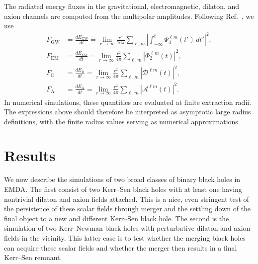 The radiated energy fluxes in the gravitational, electromagnetic, dilaton, and axion channels are computed from the multipolar amplitudes. Following Ref.~\cite{Zilhao2012}, we use
\begin{align}
    F_{\mathrm{GW}}
    &=
    \frac{dE_{\mathrm{GW}}}{dt}
    =
    \lim_{r\to\infty}
    \frac{r^2}{16\pi}
    \sum_{\ell,m}
    \left|
        \int_{-\infty}^{t}
        \Psi_4^{\ell m}(t')\,dt'
    \right|^2,
    \label{eq:app waveex gw flux}
    \\
    F_{\mathrm{EM}}
    &=
    \frac{dE_{\mathrm{EM}}}{dt}
    =
    \lim_{r\to\infty}
    \frac{r^2}{4\pi}
    \sum_{\ell,m}
    \left|
        \Phi_2^{\ell m}(t)
    \right|^2,
    \label{eq:app waveex em flux}
    \\
    F_{\mathrm{D}}
    &=
    \frac{dE_{\mathrm{D}}}{dt}
    =
    \lim_{r\to\infty}
    \frac{r^2}{4\pi}
    \sum_{\ell,m}
    \left|
        \mathcal{D}^{\ell m}(t)
    \right|^2,
    \label{eq:app waveex dilaton flux}
    \\
    F_{\mathrm{A}}
    &=
    \frac{dE_{\mathrm{A}}}{dt}
    =
    \lim_{r\to\infty}
    \frac{r^2}{4\pi}
    \sum_{\ell,m}
    \left|
        \mathcal{A}^{\ell m}(t)
    \right|^2 .
    \label{eq:app waveex axion flux}
\end{align}
In numerical simulations, these quantities are evaluated at finite extraction radii. The expressions above should therefore be interpreted as asymptotic large radius definitions, with the finite radius values serving as numerical approximations.



\section{Results}
\label{sec:results_1}

We now describe the simulations of two broad classes of binary black holes in EMDA.  The first consist of two Kerr--Sen black holes with at least one having nontrivial dilaton and axion fields attached.  This is a nice, even stringent test of the persistence of these scalar fields through merger and the settling down of the final object to a new and different Kerr--Sen black hole.  The second is the simulation of two Kerr--Newman black holes with perturbative dilaton and axion fields in the vicinity.  This latter case is to test whether the merging black holes can acquire these scalar fields and whether the merger then results in a final Kerr--Sen remnant.  



